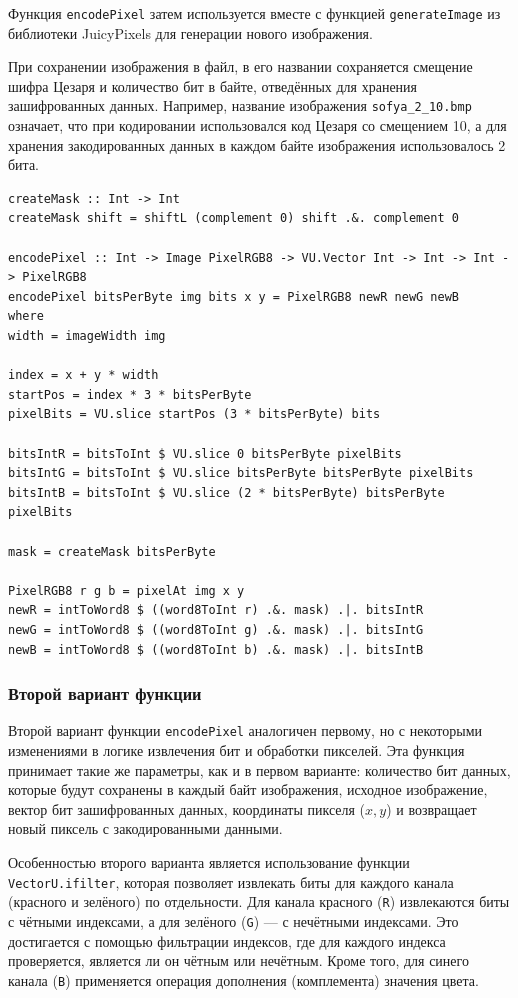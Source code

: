 \documentclass[11pt,a4paper,final]{article} %
\begin{document}
Функция \texttt{encodePixel} затем используется вместе с функцией \texttt{generateImage} из библиотеки JuicyPixels для генерации нового изображения.

При сохранении изображения в файл, в его названии сохраняется смещение шифра Цезаря и количество бит в байте, отведённых для хранения зашифрованных данных. Например, название изображения \texttt{sofya\_2\_10.bmp} означает, что при кодировании использовался код Цезаря со смещением 10, а для хранения закодированных данных в каждом байте изображения использовалось 2 бита.

\begin{lstlisting}[caption={Функции для создания изображения с закодированными данными.}, label={lst:genImg}]
createMask :: Int -> Int
createMask shift = shiftL (complement 0) shift .&. complement 0

encodePixel :: Int -> Image PixelRGB8 -> VU.Vector Int -> Int -> Int -> PixelRGB8
encodePixel bitsPerByte img bits x y = PixelRGB8 newR newG newB
where
width = imageWidth img

index = x + y * width
startPos = index * 3 * bitsPerByte
pixelBits = VU.slice startPos (3 * bitsPerByte) bits

bitsIntR = bitsToInt $ VU.slice 0 bitsPerByte pixelBits
bitsIntG = bitsToInt $ VU.slice bitsPerByte bitsPerByte pixelBits
bitsIntB = bitsToInt $ VU.slice (2 * bitsPerByte) bitsPerByte pixelBits

mask = createMask bitsPerByte

PixelRGB8 r g b = pixelAt img x y
newR = intToWord8 $ ((word8ToInt r) .&. mask) .|. bitsIntR
newG = intToWord8 $ ((word8ToInt g) .&. mask) .|. bitsIntG
newB = intToWord8 $ ((word8ToInt b) .&. mask) .|. bitsIntB
\end{lstlisting}


\subsubsection{Второй вариант функции}

Второй вариант функции \texttt{encodePixel} аналогичен первому, но с некоторыми изменениями в логике извлечения бит и обработки пикселей. Эта функция принимает такие же параметры, как и в первом варианте: количество бит данных, которые будут сохранены в каждый байт изображения, исходное изображение, вектор бит зашифрованных данных, координаты пикселя (\(x, y\)) и возвращает новый пиксель с закодированными данными.

Особенностью второго варианта является использование функции \texttt{VectorU.ifilter}, которая позволяет извлекать биты для каждого канала (красного и зелёного) по отдельности. Для канала красного (\texttt{R}) извлекаются биты с чётными индексами, а для зелёного (\texttt{G}) — с нечётными индексами. Это достигается с помощью фильтрации индексов, где для каждого индекса проверяется, является ли он чётным или нечётным. Кроме того, для синего канала (\texttt{B}) применяется операция дополнения (комплемента) значения цвета.
\end{document}
